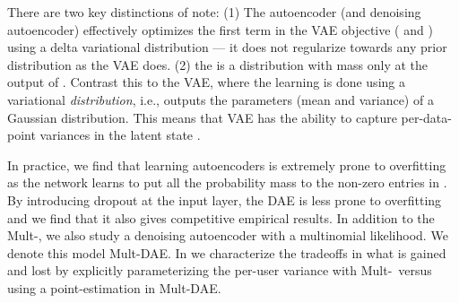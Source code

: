 \documentclass[sigconf]{acmart}
\newcommand{\mvae}{{\small Mult-}}
\newcommand{\mdae}{{\small Mult-}\gls{DAE}}
\begin{document}
There are two key distinctions of note: 
(1) The autoencoder (and denoising autoencoder) effectively optimizes the first term in the \gls{VAE} objective ( 
and ) using a delta variational distribution  --- 
it does not regularize  towards any prior distribution as the \gls{VAE} does. 
(2) the  is a  distribution with 
mass only at the output of . Contrast this to the \gls{VAE}, where the learning is done using a variational \emph{distribution},
i.e.,  outputs the parameters (mean and variance) of a Gaussian distribution. This means that \gls{VAE} has the ability to capture
per-data-point variances in the latent state . 

In practice, we find that learning autoencoders is  
extremely prone to overfitting as the network learns to put all the probability mass to the non-zero
entries in . By introducing dropout \citep{srivastava2014dropout} at the input layer, the \gls{DAE} is less
prone to overfitting and we find that it also gives competitive empirical results. In addition to the \mvae, we also study a denoising autoencoder 
with a multinomial likelihood. We denote this model \mdae. 
In  
we characterize the tradeoffs in what is gained and lost by explicitly 
parameterizing the per-user variance with \mvae~versus using a point-estimation in \mdae. 
\end{document}
